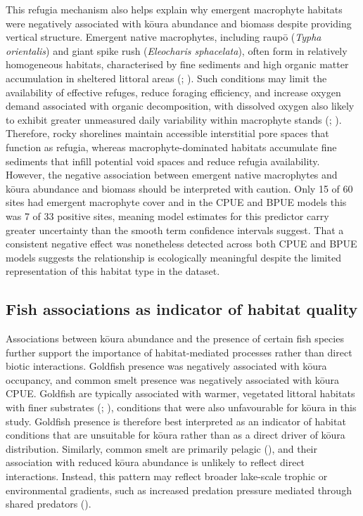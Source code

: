 \documentclass[
  letterpaper,
  DIV=11,
  numbers=noendperiod]{scrartcl}
\newcounter{none} %
\begin{document}
This refugia mechanism also helps explain why emergent macrophyte
habitats were negatively associated with kōura abundance and biomass
despite providing vertical structure. Emergent native macrophytes,
including raupō (\emph{Typha orientalis}) and giant spike rush
(\emph{Eleocharis sphacelata}), often form in relatively homogeneous
habitats, characterised by fine sediments and high organic matter
accumulation in sheltered littoral areas
(;
). Such conditions may
limit the availability of effective refuges, reduce foraging efficiency,
and increase oxygen demand associated with organic decomposition, with
dissolved oxygen also likely to exhibit greater unmeasured daily
variability within macrophyte stands (; ).
Therefore, rocky shorelines maintain accessible interstitial pore spaces
that function as refugia, whereas macrophyte-dominated habitats
accumulate fine sediments that infill potential void spaces and reduce
refugia availability. However, the negative association between emergent
native macrophytes and kōura abundance and biomass should be interpreted
with caution. Only 15 of 60 sites had emergent macrophyte cover and in
the CPUE and BPUE models this was 7 of 33 positive sites, meaning model
estimates for this predictor carry greater uncertainty than the smooth
term confidence intervals suggest. That a consistent negative effect was
nonetheless detected across both CPUE and BPUE models suggests the
relationship is ecologically meaningful despite the limited
representation of this habitat type in the dataset.

\subsection{Fish associations as indicator of habitat
quality}\label{fish-associations-as-indicator-of-habitat-quality}

Associations between kōura abundance and the presence of certain fish
species further support the importance of habitat-mediated processes
rather than direct biotic interactions. Goldfish presence was negatively
associated with kōura occupancy, and common smelt presence was
negatively associated with kōura CPUE. Goldfish are typically associated
with warmer, vegetated littoral habitats with finer substrates
(; ), conditions that were also unfavourable for kōura
in this study. Goldfish presence is therefore best interpreted as an
indicator of habitat conditions that are unsuitable for kōura rather
than as a direct driver of kōura distribution. Similarly, common smelt
are primarily pelagic (), and their
association with reduced kōura abundance is unlikely to reflect direct
interactions. Instead, this pattern may reflect broader lake-scale
trophic or environmental gradients, such as increased predation pressure
mediated through shared predators ().
\end{document}
